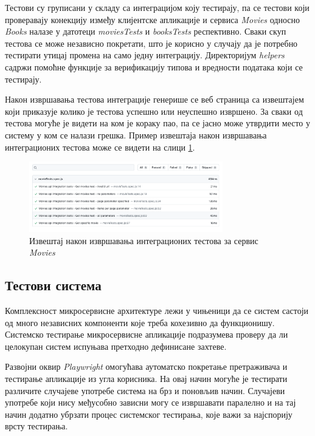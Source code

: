 \documentclass[12pt,oneside]{memoir}
\begin{document}
Тестови су груписани у складу са интеграцијом коју тестирају, па се тестови који проверавају конекцију између клијентске апликације и сервиса \textit{Movies} односно \textit{Books} налазе у датотеци \textit{moviesTests} и \textit{booksTests} респективно. Сваки скуп тестова се може независно покретати, што је корисно у случају да је потребно тестирати утицај промена на само једну интеграцију. Директоријум \textit{helpers} садржи помоћне функције за верификацију типова и вредности података који се тестирају.

Након извршавања тестова интеграције генерише се веб страница са извештајем који приказује колико је тестова успешно или неуспешно извршено. За сваки од тестова могуће је видети на ком је кораку пао, па се јасно може утврдити место у систему у ком се налази грешка. Пример извештаја након извршавања интеграционих тестова може се видети на слици \ref{fig:integrationReport}.

\begin{figure}[!ht]
  \centering
  \includegraphics[width=0.75\textwidth]{matfmaster/img/integrationReport.png}
  \caption{Извештај након извршавања интеграционих тестова за сервис \textit{Movies}}
  \label{fig:integrationReport}
\end{figure}
\newpage
\subsection{Тестови система}

Комплексност микросервисне архитектуре лежи у чињеници да се систем састоји од много независних компоненти које треба кохезивно да функционишу. Системско тестирање микросервисне апликације подразумева проверу да ли целокупан систем испуњава претходно дефинисане захтеве.

Развојни оквир \textit{Playwright} омогућава аутоматско покретање претраживача и тестирање апликације из угла корисника. На овај начин могуће је тестирати различите случајеве употребе система на брз и поновљив начин. Случајеви употребе који нису међусобно зависни могу се извршавати паралелно и на тај начин додатно убрзати процес системског тестирања, које важи за најспорију врсту тестирања.
\end{document}
